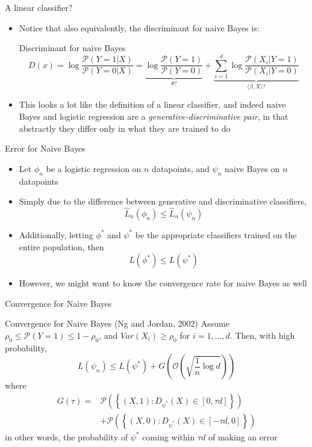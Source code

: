 \documentclass{beamer}
\renewcommand{\Pr}[1]{\mathcal{P} \left( #1 \right)}
\newcommand{\pa}[1]{\left( #1 \right)}
\newcommand{\br}[1]{\left\{ #1 \right\} }
\newcommand{\an}[1]{\langle #1 \rangle}
\begin{document}
\begin{frame}{A linear classifier?}
\begin{itemize}
\item Notice that also equivalently, the discriminant for naive Bayes is:
\begin{block}{Discriminant for naive Bayes}
\[ D(x) = \log \frac{\Pr{Y=1|X}}{\Pr{Y=0|X}} = \underbrace{\log\frac{\Pr{Y=1}}{\Pr{Y=0}}}_{\theta?} +  \underbrace{\sum_{i=1}^d \log \frac{\Pr{X_i|Y=1}}{\Pr{X_i|Y=0}}}_{\an{\beta,X}?} \]
\end{block}
\item This looks a lot like the definition of a linear classifier, and indeed naive Bayes and logistic regression are a \emph{generative-discriminative pair}, in that abstractly they differ only in what they are trained to do
\end{itemize}
\end{frame}

\begin{frame}{Error for Naive Bayes}
\begin{itemize}
\item Let $\phi_n$ be a logistic regression on $n$ datapoints, and $\psi_n$ naive Bayes on $n$ datapoints
\item Simply due to the difference between generative and discriminative classifiers,
\[ \hat{L}_n(\phi_n) \leq \hat{L}_n(\psi_n) \]
\item Additionally, letting $\phi^*$ and $\psi^*$ be the appropriate classifiers trained on the entire population, then
\[ L(\phi^*) \leq L(\psi^*) \]
\item However, we might want to know the convergence rate for naive Bayes as well
\end{itemize}
\end{frame}

\begin{frame}{Convergence for Naive Bayes}
\begin{block}{Convergence for Naive Bayes (Ng and Jordan, 2002)}
Assume  $\rho_0 \leq \Pr{Y=1} \leq 1 - \rho_0$, and $Var(X_i) \geq \rho_0$ for $i=1,\ldots,d$. Then, with high probability,
\[ L(\psi_n) \leq L(\psi^*) + G\pa{\mathcal O\pa{\sqrt{\frac1n \log d}}} \]
where
\begin{align*}
 G(\tau)   = &  \Pr{\br{(X,1) : D_{\psi^*}(X) \in [0,\tau d]}} \\
 	&   + \Pr{ \br{(X,0) : D_{\psi^*}(X) \in [-\tau d,0]}} \end{align*}
in other words, the probability of $\psi^*$ coming within $\tau d$ of making an error
\end{block}
\end{frame}
\end{document}
